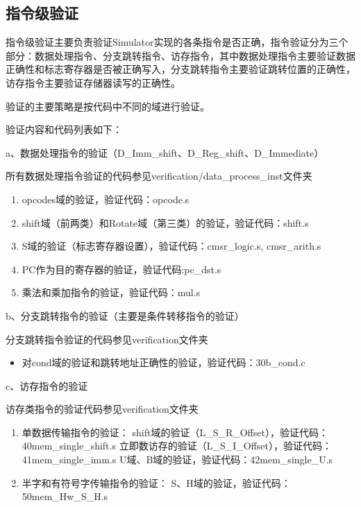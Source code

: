 \documentclass[12pt,a4paper]{article}
\begin{document}
\subsection{指令级验证}

指令级验证主要负责验证Simulator实现的各条指令是否正确，指令验证分为三个部分：数据处理指令、分支跳转指令、访存指令，其中数据处理指令主要验证数据正确性和标志寄存器是否被正确写入，分支跳转指令主要验证跳转位置的正确性，访存指令主要验证存储器读写的正确性。

验证的主要策略是按代码中不同的域进行验证。

验证内容和代码列表如下：

a、数据处理指令的验证（D\_Imm\_shift、D\_Reg\_shift、D\_Immediate）

所有数据处理指令验证的代码参见verification/data\_process\_inst文件夹 

\begin{enumerate}
    \item opcodes域的验证，验证代码：opcode.s
    \item shift域（前两类）和Rotate域（第三类）的验证，验证代码：shift.s
    \item S域的验证（标志寄存器设置），验证代码：cmsr\_logic.s, cmsr\_arith.s
    \item PC作为目的寄存器的验证，验证代码:pc\_dst.s
    \item 乘法和乘加指令的验证，验证代码：mul.s
\end{enumerate}
    
b、分支跳转指令的验证（主要是条件转移指令的验证）

分支跳转指令验证的代码参见verification文件夹

\begin{itemize}
    \item 对cond域的验证和跳转地址正确性的验证，验证代码：30b\_cond.c
\end{itemize}
    
c、访存指令的验证

访存类指令的验证代码参见verification文件夹

\begin{enumerate}
    \item 单数据传输指令的验证：
    \subitem shift域的验证（L\_S\_R\_Offset），验证代码：40mem\_single\_shift.s
    \subitem 立即数访存的验证（L\_S\_I\_Offset），验证代码：41mem\_single\_imm.s
    \subitem U域、B域的验证，验证代码：42mem\_single\_U.s
    \item 半字和有符号字传输指令的验证：
    \subitem S、H域的验证，验证代码：50mem\_Hw\_S\_H.s
\end{enumerate}
\end{document}
